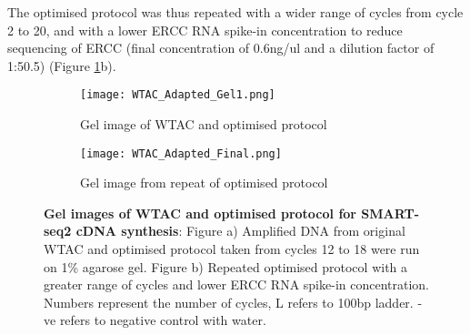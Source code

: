 The optimised protocol was thus repeated with a wider range of cycles from cycle 2 to 20, and with a lower ERCC RNA spike-in concentration to reduce sequencing of ERCC (final concentration of 0.6ng/ul and a dilution factor of 1:50.5) (Figure \ref{fig:wtac_optimised_gel1_2}b). 
    

\begin{figure}[h]
	\centering
	\begin{subfigure}{0.4\linewidth}
		\texttt{[image: WTAC\_Adapted\_Gel1.png]}
		\caption{Gel image of WTAC and optimised protocol}
	\end{subfigure}
	\hspace{2em}
	\begin{subfigure}{0.4\linewidth}
		\texttt{[image: WTAC\_Adapted\_Final.png]}
		\caption{Gel image from repeat of optimised protocol}
	\end{subfigure}
	\captionsetup{width=0.95\textwidth}
	\caption[Gel image of repeated optimised protocol]%
	{\textbf{Gel images of WTAC and optimised protocol for SMART-seq2 cDNA synthesis}: Figure a) Amplified DNA from original WTAC and optimised protocol taken from cycles 12 to 18 were run on 1\% agarose gel. Figure b) Repeated optimised protocol with a greater range of cycles and lower ERCC RNA spike-in concentration. Numbers represent the number of cycles, L refers to 100bp ladder. -ve refers to negative control with water.} 
	\label{fig:wtac_optimised_gel1_2}
\end{figure} 

